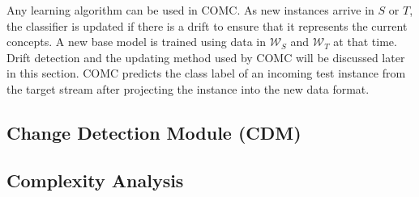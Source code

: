 Any learning algorithm can be used in COMC. As new instances arrive in $S$ or $T$, the classifier is updated if there is a drift to ensure that it represents the current concepts. A new base model is trained using data in $\mathcal{W}_S$ and $\mathcal{W}_T$ at that time. Drift detection and the updating method used by COMC will be discussed later in this section. COMC predicts the  class label of an incoming test instance from the target stream after projecting the instance into the new data format.


\subsection{Change Detection Module (CDM)}

\subsection{Complexity Analysis}